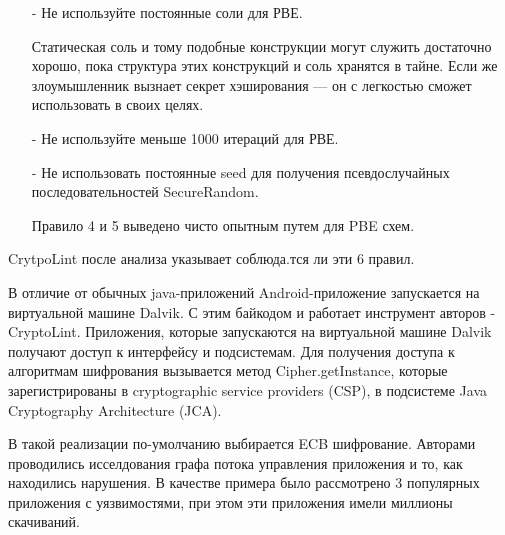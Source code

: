 \documentclass[11pt, a4paper]{article}		%
\begin{document}
\begin{itemize}
\item[-] Не используйте постоянные соли для РВЕ.

Статическая соль и тому подобные конструкции могут служить достаточно хорошо, пока структура этих конструкций и соль хранятся в тайне. Если же злоумышленник вызнает секрет хэширования — он с легкостью сможет использовать в своих целях.

\item[-] Не используйте меньше 1000 итераций для РВЕ.

\item[-]  Не использовать постоянные seed для получения псевдослучайных последовательностей SecureRandom.

Правило 4 и 5 выведено чисто опытным путем для PBE схем.

\end{itemize}

CrytpoLint после анализа указывает соблюда.тся ли эти 6 правил.

В отличие от обычных java-приложений Android-приложение запускается на виртуальной машине Dalvik. С этим байкодом и работает инструмент авторов - CryptoLint. Приложения, которые запускаются на виртуальной машине Dalvik получают доступ к интерфейсу и подсистемам. Для получения доступа к алгоритмам шифрования вызывается метод Cipher.getInstance, которые зарегистрированы в cryptographic service providers
(CSP), в подсистеме Java Cryptography Architecture (JCA). 

В такой реализации по-умолчанию выбирается ECB шифрование. Авторами проводились исселдования графа потока управления приложения и то, как находились нарушения. В качестве примера было рассмотрено 3 популярных приложения с уязвимостями, при этом эти приложения имели миллионы скачиваний. 
\end{document}
